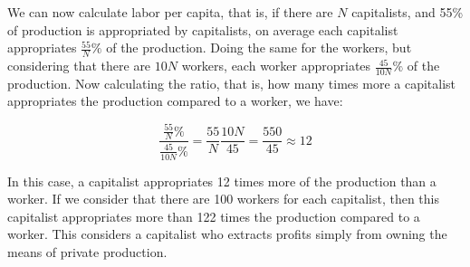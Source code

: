 We can now calculate labor per capita, that is, if there are $N$ capitalists, and 55\% of production is appropriated by capitalists, on average each capitalist appropriates $\frac{55}{N}\%$ of the production. Doing the same for the workers, but considering that there are $10N$ workers, each worker appropriates $\frac{45}{10N}\%$ of the production. Now calculating the ratio, that is, how many times more a capitalist appropriates the production compared to a worker, we have:


\begin{equation}
\frac{\frac{55}{N}\%}{\frac{45}{10N}\%}=\frac{55}{N}\frac{10N}{45}=\frac{550}{45}\approx 12
\end{equation}

In this case, a capitalist appropriates 12 times more of the production than a worker. If we consider that there are 100 workers for each capitalist, then this capitalist appropriates more than 122 times the production compared to a worker. This considers a capitalist who extracts profits simply from owning the means of private production.

